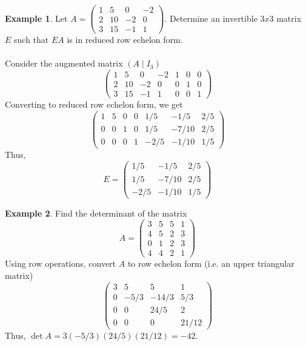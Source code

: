 \documentclass[letterpaper,12pt]{article}
\theoremstyle{definition}
\newtheorem*{example}{Example}
\begin{document}
\begin{example}
Let $A = \begin{pmatrix} 1 & 5 & 0 & -2 \\ 2 & 10 & -2 & 0 \\ 3 & 15 & -1 & 1 \end{pmatrix}$. Determine an invertible $3x3$ matrix $E$ such that $EA$ is in reduced row echelon form.
\\ \\ Consider the augmented matrix $(A \mid I_3)$
\begin{equation*}
    \left(\begin{array}{cccc|ccc}
    1 & 5 & 0 & -2 & 1 & 0 & 0 \\
    2 & 10 & -2 & 0 & 0 & 1 & 0 \\
    3 & 15 & -1 & 1 & 0 & 0 & 1
    \end{array} \right)
\end{equation*}
Converting to reduced row echelon form, we get
\begin{equation*}
    \left(\begin{array}{cccc|ccc}
    1 & 5 & 0 & 0 & 1/5 & -1/5 & 2/5 \\
    0 & 0 & 1 & 0 & 1/5 & -7/10 & 2/5 \\
    0 & 0 & 0 & 1 & -2/5 & -1/10 & 1/5
    \end{array} \right)
\end{equation*}
Thus,
\begin{equation*}
    E = \begin{pmatrix} 1/5 & -1/5 & 2/5 \\ 1/5 & -7/10 & 2/5 \\ -2/5 & -1/10 & 1/5 \end{pmatrix}
\end{equation*}
\end{example}


\begin{example}
Find the determinant of the matrix
\begin{equation*}
    A = \begin{pmatrix} 3 & 5 & 5 & 1 \\ 4 & 5 & 2 & 3 \\ 0 & 1 & 2 & 3 \\ 4 & 4 & 2 & 1 \end{pmatrix}
\end{equation*}
Using row operations, convert $A$ to row echelon form (i.e. an upper triangular matrix)
\begin{equation*}
    \begin{pmatrix} 3 & 5 & 5 & 1 \\ 0 & -5/3 & -14/3 & 5/3 \\ 0 & 0 & 24/5 & 2 \\ 0 & 0 & 0 & 21/12 \end{pmatrix}
\end{equation*}
Thus, $\det{A} = 3 (-5/3)(24/5)(21/12) = -42$.
\end{example}
\end{document}

